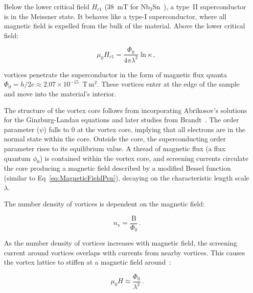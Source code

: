     Below the lower critical field $H_{c1}$ ($38$~mT for Nb$_3$Sn~\cite{godekeNb3SnRadioFrequency2006}), a type~II superconductor is in the Meissner state. It behaves like a type-I superconductor, where all magnetic field is expelled from the bulk of the material. Above the lower critical field:

    \begin{equation}
        \mu_0 H_{c1} = \frac{\Phi_0}{4\pi \lambda^2}\ln\kappa \,,
        ~\label{eq:FirstCriticalField}
    \end{equation} 

    \noindent vortices penetrate the superconductor in the form of magnetic flux quanta $\Phi_0 = h/2e \approx2.07\times 10^{-15}$~T\,m$^2$. These vortices enter at the edge of the sample and move into the material's interior. 

    The structure of the vortex core follows from incorporating Abrikosov's solutions~\cite{abrikosovMagneticPropertiesSuperconducting1957} for the Ginzburg-Landau equations and later studies from Brandt~\cite{brandtFluxlineLatticeSuperconductors1995}. The order parameter ($\psi$) falls to 0 at the vortex core, implying that all electrons are in the normal state within the core. Outside the core, the superconducting order parameter rises to its equilibrium value. A thread of magnetic flux (a flux quantum $\phi_0$) is contained within the vortex core, and screening currents circulate the core producing a magnetic field described by a modified Bessel function (similar to Eq~\ref{eq:MagneticFieldPen}), decaying on the characteristic length scale $\lambda$.
    
    The number density of vortices is dependent on the magnetic field:

    \begin{equation}
        n_\text{v} = \frac{\text{B}}{\Phi_0}
        \,.\label{eq:numberofvortices}
    \end{equation} 


    \noindent As the number density of vortices increases with magnetic field, the screening current around vortices overlaps with currents from nearby vortices. This causes the vortex lattice to stiffen at a magnetic field around~\cite{larkinPinningTypeII1979, blatterVorticesHightemperatureSuperconductors1994}:

    \begin{equation}
        \mu_0 H \approx \frac{\Phi_0}{\lambda^2}
        \,.\label{eq:Hstiff}
    \end{equation} 

